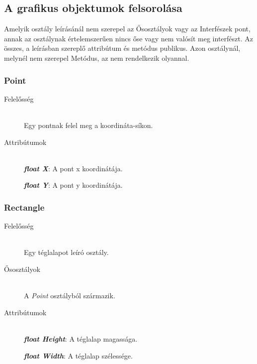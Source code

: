 \subsection{A grafikus objektumok felsorolása}
Amelyik osztály leírásánál nem szerepel az Ősosztályok vagy az Interfészek pont, annak az osztálynak értelemszerűen nincs őse vagy nem valósít meg interfészt. Az összes, a leírásban szereplő attribútum és metódus publikus. Azon osztálynál, melynél nem szerepel Metódus, az nem rendelkezik olyannal.

\subsubsection{Point}
	\begin{description}
		\item[Felelősség] \hfill \\
		Egy pontnak felel meg a koordináta-síkon.
		
		\item[Attribútumok]\hfill \\
		\textbf{\emph{float X}}: A pont x koordinátája.
		
		\textbf{\emph{float Y}}: A pont y koordinátája.		

	\end{description}
	
\subsubsection{Rectangle}
	\begin{description}
		\item[Felelősség] \hfill \\
		Egy téglalapot leíró osztály.
		
		\item[Ősosztályok] \hfill \\
		A {\itshape Point}	osztályból származik.		
		
		\item[Attribútumok]\hfill \\
		\textbf{\emph{float Height}}: A téglalap magassága.
		
		\textbf{\emph{float Width}}: A téglalap szélessége.		
	\end{description}
	
